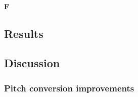 \paragraph*{F}

\subsection{Results}


\subsection{Discussion}

\subsubsection{Pitch conversion improvements}

\subsub




